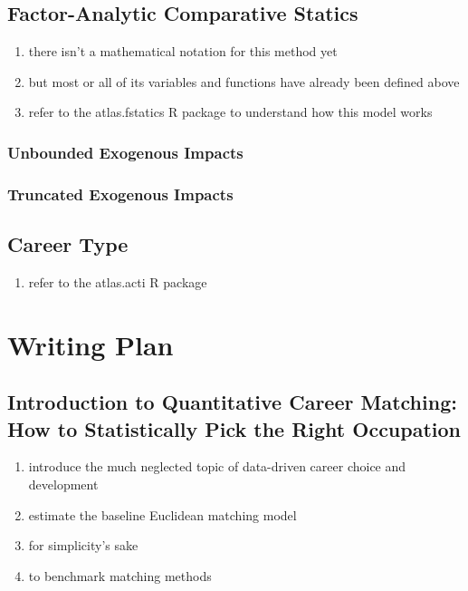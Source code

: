 \documentclass{elsarticle} %
\begin{document}
\subsection{Factor-Analytic Comparative Statics}
\begin{enumerate}
    \item there isn't a mathematical notation for this method yet
    \item but most or all of its variables and functions have already been defined above
    \item refer to the atlas.fstatics R package to understand how this model works
\end{enumerate}
\subsubsection{Unbounded Exogenous Impacts}
\subsubsection{Truncated Exogenous Impacts}
\subsection{Career Type}
\begin{enumerate}
    \item refer to the atlas.acti R package
\end{enumerate}

\section{Writing Plan}
\subsection{Introduction to Quantitative Career Matching: How to Statistically Pick the Right Occupation}
\begin{enumerate}
    \item introduce the much neglected topic of data-driven career choice and development
    \item estimate the baseline Euclidean matching model
    \item for simplicity's sake
    \item to benchmark matching methods
\end{enumerate}
\end{document}
